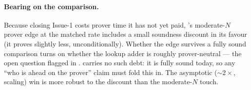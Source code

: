 \paragraph{Bearing on the comparison.} Because closing Issue-1 costs
\zinc{} prover time it has not yet paid, \zinc{}'s moderate-$N$ prover edge
at the matched rate includes a small soundness discount in its favour (it
proves slightly less, unconditionally). Whether the edge survives a fully
sound comparison turns on whether the lookup adder is roughly
prover-neutral --- the open question flagged in .
\binius{} carries no such debt: it is fully sound today, so any ``who is
ahead on the prover'' claim must fold this in. The asymptotic
($\sim$$2\times$, scaling) win is more robust to the discount than the
moderate-$N$ touch.
